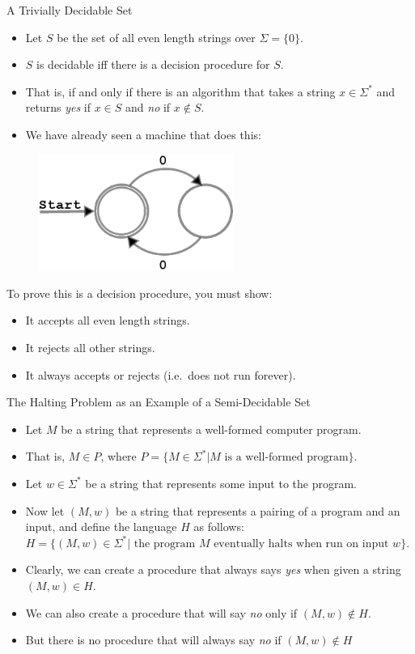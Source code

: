 \documentclass[style=sailor,size=12pt]{powerdot}
\theoremstyle{definition}
\begin{document}
\begin{wideslide}[bm=,toc=]{A Trivially Decidable Set}
\begin{itemize}
\item Let $S$ be the set of all even length strings over $\Sigma = \{0\}$. 
\item $S$ is decidable iff there is a decision procedure for $S$.
\item That is, if and only if there is an algorithm that takes a string $x \in
\Sigma^*$ and returns \emph{yes} if $x \in S$ and \emph{no} if $x \notin S$.
\item We have already seen a machine that does this: 
\end{itemize}
\begin{figure}[h]
\centering
\includegraphics[width=2.5in, height=.75in,keepaspectratio=true]{evenzeroautomata.eps}
\label{2sp}
\end{figure}
To prove this is a decision procedure, you must show:
\begin{itemize}
\item It accepts all even length strings. 
\item It rejects all other strings. 
\item It always accepts or rejects (i.e.\ does not run forever).
\end{itemize}
\end{wideslide}

\begin{wideslide}[bm=,toc=]{The Halting Problem as an Example of a Semi-Decidable Set}
\begin{itemize}
\item Let $M$ be a string that represents a well-formed computer program.
\item That is, $M \in P$, where $P = \{M \in \Sigma^* | M \text{ is a well-formed 
  program}\}$.
\item Let $w \in \Sigma^*$ be a string that represents some input to the program.
\item Now let $(M,w)$ be a string that represents a pairing of a program and an
input, and define the language $H$ as follows:\\ 
$H = \{(M,w) \in \Sigma^* | \text{ the program } M
\text{ eventually halts when run on input } w\}$.
\item Clearly, we can create a procedure that always says \emph{yes} when given a
string $(M,w) \in H$. 
\item We can also create a procedure that will say \emph{no} only if $(M,w) \notin H$.
\item But there is no procedure that will always say \emph{no} if $(M,w) \notin H$
\end{itemize}
\end{wideslide}
\end{document}
